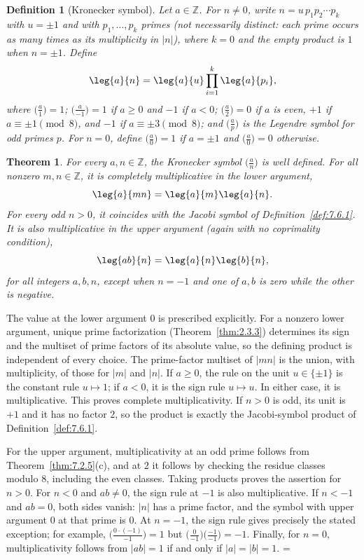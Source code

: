 \documentclass[11pt]{article}
\makeatletter
\theoremstyle{ntstyle}
\newtheorem{theorem}{Theorem}[subsection]
\newtheorem{definition}{Definition}[subsection]
\let\nt@closedisplay\]
\def\nt@guardedclose{\@ifnextchar\par{\nt@closeafterpar}{\@ifnextchar\end{\postdisplaypenalty\@M\nt@closedisplay}{\nt@closedisplay}}}
\def\nt@closeafterpar\par{\@ifnextchar\par{\nt@closeafterpar}{\@ifnextchar\end{\postdisplaypenalty\@M\nt@closedisplay\par}{\nt@closedisplay\par}}}
\renewenvironment{proof}[1][\proofname]{\par
  \pushQED{\qed}\normalfont\topsep\medskipamount\edef\nt@afterproof{\@endparpenalty=\the\@endparpenalty\relax}\@beginparpenalty\@M\@endparpenalty\@M\let\]\nt@guardedclose\trivlist\item[]\textit{#1\@addpunct{.}} \ignorespaces}{\ifvmode\addpenalty\@M\fi\popQED\nt@afterproof\endtrivlist\@endpefalse}
\newcommand{\legs}[2]{\bigl(\tfrac{#1}{#2}\bigr)}
\makeatother
\begin{document}
\begin{definition}[Kronecker symbol]\label{def:7.6.2} Let $a \in \mathbb{Z}$.
	For $n \neq 0$, write $n = u\,p_1 p_2 \cdots p_k$ with $u = \pm 1$ and
	with $p_1, \ldots, p_k$ primes (not necessarily distinct: each prime
	occurs as many times as its multiplicity in $|n|$), where $k = 0$ and the
	empty product is $1$ when $n = \pm 1$. Define
	\[
		\leg{a}{n} = \leg{a}{u}\prod_{i=1}^{k}\leg{a}{p_i},
	\]
	where $\legs{a}{1} = 1$; $\legs{a}{-1} = 1$ if $a \ge 0$ and $-1$ if $a
		< 0$; $\legs{a}{2} = 0$ if $a$ is even, $+1$ if $a \equiv \pm 1
		\pmod{8}$, and $-1$ if $a \equiv \pm 3 \pmod{8}$; and $\legs{a}{p}$ is
	the Legendre symbol for odd primes $p$. For $n = 0$, define
	$\legs{a}{0} = 1$ if $a = \pm 1$ and $\legs{a}{0} = 0$ otherwise.
\end{definition}
\begin{theorem}\label{thm:7.6.4} For every $a,n\in\mathbb{Z}$, the Kronecker symbol $\legs{a}{n}$ is well
	defined. For all nonzero $m,n\in\mathbb{Z}$, it is completely
	multiplicative in the lower argument,
	\[
		\leg{a}{mn}=\leg{a}{m}\leg{a}{n}.
	\]
	For every odd $n>0$, it coincides with the Jacobi symbol of Definition~\ref{def:7.6.1}.
	It is also multiplicative in the upper argument (again with no coprimality condition),
	\[
		\leg{ab}{n}=\leg{a}{n}\leg{b}{n},
	\]
	for all integers $a,b,n$, except when $n=-1$ and one of $a,b$ is zero
	while the other is negative.
\end{theorem}

\begin{proof} The value at the lower argument $0$ is prescribed
	explicitly. For a nonzero lower argument, unique prime factorization
	(Theorem~\ref{thm:2.3.3}) determines its sign and the multiset of prime factors of its absolute
	value, so the defining product is independent of every choice. The
	prime-factor multiset of $|mn|$ is the union, with multiplicity, of
	those for $|m|$ and $|n|$. If $a\ge0$, the rule on the unit
	$u\in\{\pm1\}$ is the constant rule $u\mapsto1$; if $a<0$, it is
	the sign rule $u\mapsto u$. In either case, it is multiplicative. This proves complete
	multiplicativity. If $n>0$ is odd, its unit is $+1$ and it has no factor
	$2$, so the product is exactly the Jacobi-symbol product of Definition~\ref{def:7.6.1}.

	For the upper argument, multiplicativity at an odd prime follows from
	Theorem~\ref{thm:7.2.5}(c), and at $2$ it follows by checking the
	residue classes modulo $8$, including the even classes. Taking products
	proves the assertion for $n>0$. For $n<0$ and $ab\neq0$, the sign rule
	at $-1$ is also multiplicative. If $n<-1$ and $ab=0$, both sides vanish:
	$|n|$ has a prime factor, and the symbol with upper argument $0$ at
	that prime is $0$. At $n=-1$, the sign rule gives precisely the stated
	exception; for example, $\legs{0\cdot(-1)}{-1}=1$ but
	$\legs{0}{-1}\legs{-1}{-1}=-1$. Finally, for $n=0$, multiplicativity
	follows from $|ab|=1$ if and only if $|a|=|b|=1$.
\end{proof}
\end{document}
